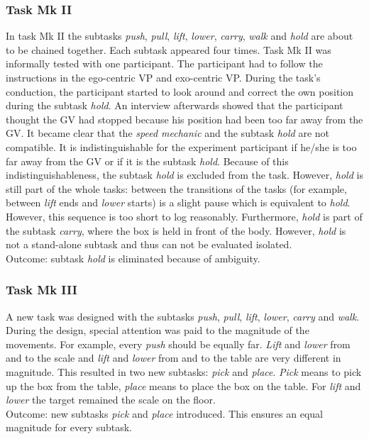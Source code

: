 \subsubsection{Task Mk II}
In task Mk II the subtasks \textit{push}, \textit{pull}, \textit{lift}, \textit{lower}, \textit{carry}, \textit{walk} and \textit{hold} are about to be chained together. Each subtask appeared four times. Task Mk II was informally tested with one participant. The participant had to follow the instructions in the ego-centric VP and exo-centric VP. During the task's conduction, the participant started to look around and correct the own position during the subtask \textit{hold}. An interview afterwards showed that the participant thought the GV had stopped because his position had been too far away from the GV. It became clear that the \textit{speed mechanic} and the subtask \textit{hold} are not compatible. It is indistinguishable for the experiment participant if he/she is too far away from the GV or if it is the subtask \textit{hold}. Because of this indistinguishableness, the subtask \textit{hold} is excluded from the task. However, \textit{hold} is still part of the whole tasks: between the transitions of the tasks (for example, between \textit{lift} ends and \textit{lower} starts) is a slight pause which is equivalent to \textit{hold}. However, this sequence is too short to log reasonably. Furthermore, \textit{hold} is part of the subtask \textit{carry}, where the box is held in front of the body. However, \textit{hold} is not a stand-alone subtask and thus can not be evaluated isolated.\\
Outcome: subtask \textit{hold} is eliminated because of ambiguity.

\subsubsection{Task Mk III}
A new task was designed with the subtasks \textit{push}, \textit{pull}, \textit{lift}, \textit{lower}, \textit{carry} and \textit{walk}. During the design, special attention was paid to the magnitude of the movements. For example, every \textit{push} should be equally far. \textit{Lift} and \textit{lower} from and to the scale and \textit{lift} and \textit{lower} from and to the table are very different in magnitude. This resulted in two new subtasks: \textit{pick} and \textit{place}. \textit{Pick} means to pick up the box from the table, \textit{place} means to place the box on the table. For \textit{lift} and \textit{lower} the target remained the scale on the floor.\\
Outcome: new subtasks \textit{pick} and \textit{place} introduced. This ensures an equal magnitude for every subtask.

